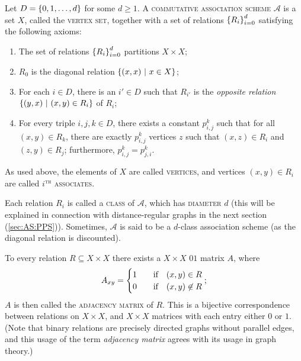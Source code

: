 \documentclass{report}
\newcommand{\AS}{\mathcal{A}}
\begin{document}
    \begin{defn}
      \label{association-scheme-comb}
      Let $D = \left\lbrace 0, 1, \ldots, d \right\rbrace$ for some $d \geq 1$.
      A \textsc{commutative association scheme} $\AS$ is a set $X$, called the
      \textsc{vertex set}, together with a set of relations $\left\lbrace R_i \right\rbrace_{i=0}^d$ 
      satisfying the following axioms:
      \begin{enumerate}
        \item The set of relations $\left\lbrace R_i \right\rbrace_{i=0}^d$ partitions $X \times X$;
          \label{cAS-part}
        \item $R_0$ is the diagonal relation $\left\lbrace  (x, x) \ \middle| \ x \in X  \right\rbrace$;
          \label{cAS-diag}
        \item For each $i \in D$, there is an $i' \in D$ such that $R_{i'}$ is
          the \textit{opposite relation} $\left\lbrace  (y, x) \ \middle| \ (x, y) \in R_i  \right\rbrace$ of
          $R_i$;
          \label{cAS-sym}
        \item For every triple $i, j, k \in D$, there exists a constant $p_{i,
          j}^k$ such that for all $(x, y) \in R_k$, there are exactly $p_{i,
          j}^k$ vertices $z$ such that $(x, z) \in R_i$ and $(z, y) \in R_j$;
          furthermore, $p_{i, j}^k = p_{j, i}^k$.
          \label{cAS-reg}
      \end{enumerate}

      As used above, the elements of $X$ are called \textsc{vertices},
      and vertices $(x, y) \in R_i$ are called \textsc{$i^\text{th}$ associates}.

      Each relation $R_i$ is called a \textsc{class} of $\AS$, which has
      \textsc{diameter} $d$ (this will be explained in connection with
      distance-regular graphs in the next section (\ref{sec:AS:PPS})).
      Sometimes, $\AS$ is said to be a $d$-class association scheme (as the
      diagonal relation is discounted).
    \end{defn}

    To every relation $R \subseteq X \times X$ there exists a $X \times X$ $01$
    matrix $A$, where
    \begin{equation}\label{adjacency-matrix}
      A_{xy} = \begin{cases}
        1 & \quad\text{if}\quad (x, y) \in R \\
        0 & \quad\text{if}\quad (x, y) \not\in R \\
      \end{cases};
    \end{equation}
    $A$ is then called the \textsc{adjacency matrix} of $R$.
    This is a bijective correspondence between relations on $X \times X$,
    and $X \times X$ matrices with each entry either $0$ or $1$.
    (Note that binary relations are precisely directed graphs without parallel
    edges, and this usage of the term \textit{adjacency matrix} agrees with its
    usage in graph theory.)
\end{document}
